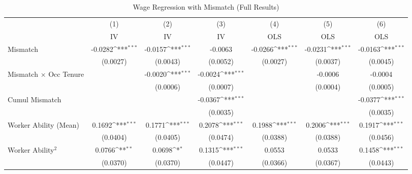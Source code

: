 {
\def\sym#1{\ifmmode^{#1}\else\(^{#1}\)\fi}
\begin{longtable}{l*{6}{c}}
\caption{Wage Regression with Mismatch (Full Results)}\\
\hline  \endfirsthead\hline  \endhead\hline  \endfoot\endlastfoot
                    &\multicolumn{1}{c}{(1)}&\multicolumn{1}{c}{(2)}&\multicolumn{1}{c}{(3)}&\multicolumn{1}{c}{(4)}&\multicolumn{1}{c}{(5)}&\multicolumn{1}{c}{(6)}\\
                    &\multicolumn{1}{c}{IV}&\multicolumn{1}{c}{IV}&\multicolumn{1}{c}{IV}&\multicolumn{1}{c}{OLS}&\multicolumn{1}{c}{OLS}&\multicolumn{1}{c}{OLS}\\
\hline  
Mismatch            &     -0.0282\sym{***}&     -0.0157\sym{***}&     -0.0063         &     -0.0266\sym{***}&     -0.0231\sym{***}&     -0.0163\sym{***}\\
                    &    (0.0027)         &    (0.0043)         &    (0.0052)         &    (0.0027)         &    (0.0037)         &    (0.0045)         \\
Mismatch $\times$ Occ Tenure&                     &     -0.0020\sym{***}&     -0.0024\sym{***}&                     &     -0.0006         &     -0.0004         \\
                    &                     &    (0.0006)         &    (0.0007)         &                     &    (0.0004)         &    (0.0005)         \\
Cumul Mismatch      &                     &                     &     -0.0367\sym{***}&                     &                     &     -0.0377\sym{***}\\
                    &                     &                     &    (0.0035)         &                     &                     &    (0.0035)         \\
Worker Ability (Mean)&      0.1692\sym{***}&      0.1771\sym{***}&      0.2078\sym{***}&      0.1988\sym{***}&      0.2006\sym{***}&      0.1917\sym{***}\\
                    &    (0.0404)         &    (0.0405)         &    (0.0474)         &    (0.0388)         &    (0.0388)         &    (0.0456)         \\
Worker Ability$^2$  &      0.0766\sym{**} &      0.0698\sym{*}  &      0.1315\sym{***}&      0.0553         &      0.0533         &      0.1458\sym{***}\\
                    &    (0.0370)         &    (0.0370)         &    (0.0447)         &    (0.0366)         &    (0.0367)         &    (0.0443)         \\

\end{longtable}}
